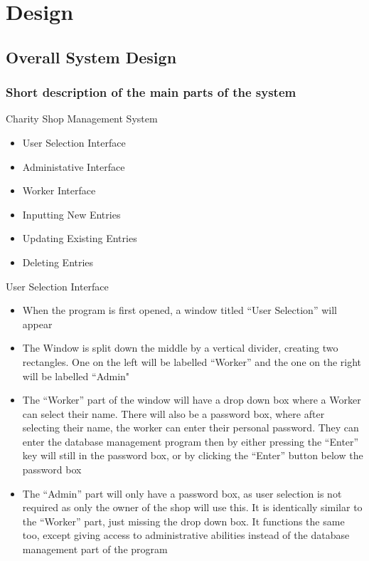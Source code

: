 \chapter{Design}

\section{Overall System Design}

\subsection{Short description of the main parts of the system}

Charity Shop Management System
\begin{itemize}
	\item User Selection Interface
	\item Administative Interface
	\item Worker Interface
	\item Inputting New Entries
	\item Updating Existing Entries
	\item Deleting Entries
\end{itemize}

User Selection Interface
\begin{itemize}
	\item When the program is first opened, a window titled “User Selection” will appear
	\item The Window is split down the middle by a vertical divider, creating two rectangles. One on the left will be labelled “Worker” and the one on the right will be labelled “Admin"
	\item The “Worker” part of the window will have a drop down box where a Worker can select their name. There will also be a password box, where after selecting their name, the worker can enter their personal password. They can enter the database management program then by either pressing the “Enter” key will still in the password box, or by clicking the “Enter” button below the password box
	\item The “Admin” part will only have a password box, as user selection is not required as only the owner of the shop will use this. It is identically similar to the “Worker” part, just missing the drop down box. It functions the same too, except giving access to administrative abilities instead of the database management part of the program
\end{itemize}

